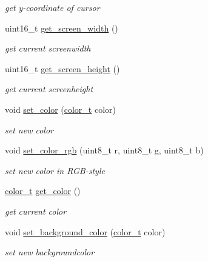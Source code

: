 \begin{CompactItemize}
\begin{CompactList}\small\item\em get y-coordinate of cursor \item\end{CompactList}\item 
uint16\_\-t \hyperlink{group__hgdi__api_g8bec741a24e406cc198d14de6533b264}{get\_\-screen\_\-width} ()
\begin{CompactList}\small\item\em get current screenwidth \item\end{CompactList}\item 
uint16\_\-t \hyperlink{group__hgdi__api_g23427ee7a3a85ad4db15258a42636535}{get\_\-screen\_\-height} ()
\begin{CompactList}\small\item\em get current screenheight \item\end{CompactList}\item 
void \hyperlink{group__hgdi__api_gda96baaa4dc5ab037974f7045c9a3868}{set\_\-color} (\hyperlink{group__hgdi__colors8_g2d1e492285f42b7772298f092243fe6b}{color\_\-t} color)
\begin{CompactList}\small\item\em set new color \item\end{CompactList}\item 
void \hyperlink{group__hgdi__api_ge97dbe5fd160d2b86ba22c067ada9f57}{set\_\-color\_\-rgb} (uint8\_\-t r, uint8\_\-t g, uint8\_\-t b)
\begin{CompactList}\small\item\em set new color in RGB-style \item\end{CompactList}\item 
\hyperlink{group__hgdi__colors8_g2d1e492285f42b7772298f092243fe6b}{color\_\-t} \hyperlink{group__hgdi__api_gd5b5f01663c117b46b1949f3b2353fa5}{get\_\-color} ()
\begin{CompactList}\small\item\em get current color \item\end{CompactList}\item 
void \hyperlink{group__hgdi__api_g4215543853fd0158a34117310a5f5efb}{set\_\-background\_\-color} (\hyperlink{group__hgdi__colors8_g2d1e492285f42b7772298f092243fe6b}{color\_\-t} color)
\begin{CompactList}\small\item\em set new backgroundcolor \item\end{CompactList}\item 

\end{CompactItemize}
